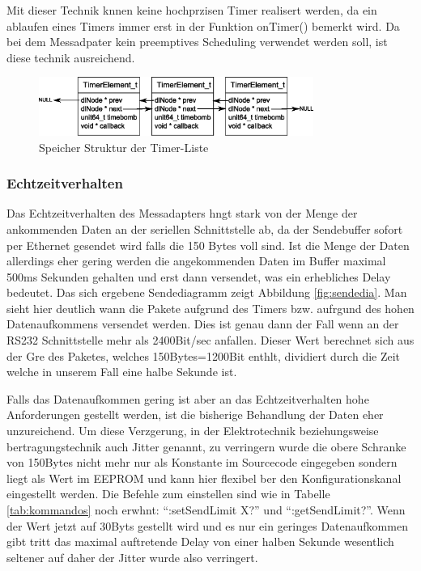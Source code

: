 \documentclass[a4paper]{book}%
\begin{document}
Mit dieser Technik knnen keine hochprzisen Timer realisert werden, da ein ablaufen eines Timers immer erst in der Funktion onTimer() bemerkt wird. Da bei dem Messadpater kein preemptives Scheduling verwendet  werden soll, ist diese technik ausreichend.


\begin{figure}[H]
	\centering
	\includegraphics[width=0.8\textwidth]{figures/speicherstrukturtimer.eps}
	\caption[Speicher Struktur der Timer-Liste]{Speicher Struktur der Timer-Liste}
	\label{fig:speicherstruktur}
\end{figure}



\newpage



\subsubsection{Echtzeitverhalten}

Das Echtzeitverhalten des Messadapters hngt stark von der Menge der ankommenden Daten an der seriellen Schnittstelle ab,
da der Sendebuffer sofort per Ethernet gesendet wird falls die 150 Bytes voll sind. Ist die Menge der Daten allerdings eher gering werden die angekommenden Daten im Buffer maximal 500ms Sekunden gehalten und erst dann versendet, was ein erhebliches Delay bedeutet. Das sich ergebene Sendediagramm zeigt Abbildung \ref{fig:sendedia}. Man sieht hier deutlich wann die Pakete aufgrund des Timers bzw. aufrgund des hohen Datenaufkommens versendet werden. Dies ist genau dann der Fall wenn an der RS232 Schnittstelle mehr als 2400Bit/sec anfallen. Dieser Wert berechnet sich aus der Gre des Paketes, welches 150Bytes=1200Bit enthlt, dividiert durch die Zeit welche in unserem Fall eine halbe Sekunde ist.
\newline
\newline

Falls das Datenaufkommen gering ist aber an das Echtzeitverhalten hohe Anforderungen gestellt werden, ist die bisherige Behandlung der Daten eher
unzureichend. Um diese Verzgerung, in der Elektrotechnik beziehungsweise bertragungstechnik auch Jitter genannt, zu verringern wurde die obere Schranke von 150Bytes nicht mehr nur als Konstante im Sourcecode eingegeben sondern liegt als Wert im EEPROM und kann hier flexibel ber den Konfigurationskanal eingestellt werden. Die Befehle zum einstellen sind wie in Tabelle \ref{tab:kommandos} noch erwhnt: "`:setSendLimit X?"' und "`:getSendLimit?"'.
Wenn der Wert jetzt auf 30Byts gestellt wird und es nur ein geringes Datenaufkommen gibt tritt das maximal auftretende Delay von einer halben Sekunde wesentlich seltener auf daher der Jitter wurde also verringert.
\end{document}
